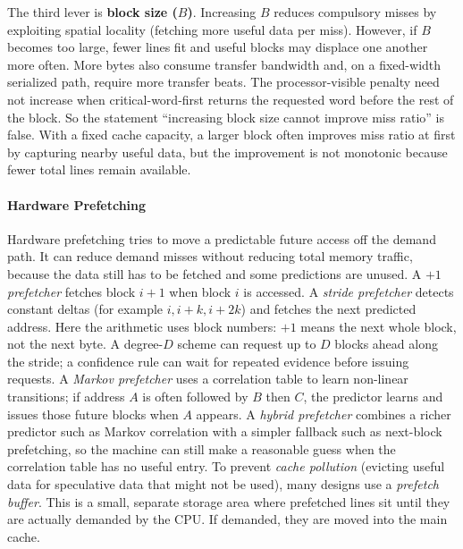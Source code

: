 The third lever is \textbf{block size ($B$)}.
Increasing $B$ reduces compulsory misses by exploiting spatial locality (fetching more useful data per miss).
However, if $B$ becomes too large, fewer lines fit and useful blocks may displace one another more often.
More bytes also consume transfer bandwidth and, on a fixed-width serialized path, require more transfer beats.
The processor-visible penalty need not increase when critical-word-first returns the requested word before the rest of the block.
So the statement ``increasing block size cannot improve miss ratio'' is false.
With a fixed cache capacity, a larger block often improves miss ratio at first by capturing nearby useful data, but the improvement is not monotonic because fewer total lines remain available.

\paragraph{Hardware Prefetching}\label{par:auto-021}
Hardware prefetching tries to move a predictable future access off the demand path.
It can reduce demand misses without reducing total memory traffic, because the data still has to be fetched and some predictions are unused.
A \textit{$+1$ prefetcher} fetches block $i+1$ when block $i$ is accessed.
A \textit{stride prefetcher} detects constant deltas (for example $i, i+k, i+2k$) and fetches the next predicted address.
Here the arithmetic uses block numbers: $+1$ means the next whole block, not the next byte.
A degree-$D$ scheme can request up to $D$ blocks ahead along the stride; a confidence rule can wait for repeated evidence before issuing requests.
A \textit{Markov prefetcher} uses a correlation table to learn non-linear transitions; if address $A$ is often followed by $B$ then $C$, the predictor learns and issues those future blocks when $A$ appears.
A \textit{hybrid prefetcher} combines a richer predictor such as Markov correlation with a simpler fallback such as next-block prefetching, so the machine can still make a reasonable guess when the correlation table has no useful entry.
To prevent \textit{cache pollution} (evicting useful data for speculative data that might not be used), many designs use a \textit{prefetch buffer}.
This is a small, separate storage area where prefetched lines sit until they are actually demanded by the CPU\@.
If demanded, they are moved into the main cache.

